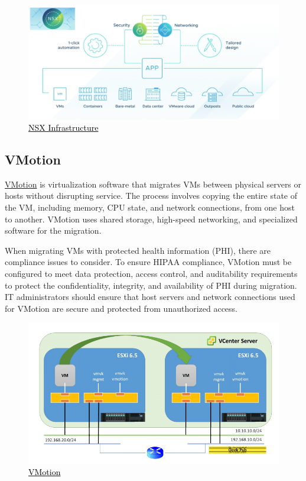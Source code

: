 \begin{figure}[H]
    \centering
    \includegraphics[scale = .19]{images/nsx-diagram.png}
    \caption{\href{https://www.linkedin.com/pulse/vmware-nsxdatacenter-full-stack-solution-part-1-ahmad-karim/}{\textcolor{black}{NSX Infrastructure}}}
    \label{NSX}
\end{figure}

\subsection{VMotion}
\href{https://www.vmware.com/products/vsphere/vmotion.html#:~:text=vMotion%20allows%20you%20to%3A,a%20virtual%20machine%20in%20seconds}{VMotion} is virtualization software that migrates VMs between physical servers or hosts without disrupting service. The process involves copying the entire state of the VM, including memory, CPU state, and network connections, from one host to another. VMotion uses shared storage, high-speed networking, and specialized software for the migration. 

When migrating VMs with protected health information (PHI), there are compliance issues to consider. To ensure HIPAA compliance, VMotion must be configured to meet data protection, access control, and auditability requirements to protect the confidentiality, integrity, and availability of PHI during migration. IT administrators should ensure that host servers and network connections used for VMotion are secure and protected from unauthorized access.

\begin{figure}[H]
    \centering
    \includegraphics[scale = .50]{images/vmotion.png}
    \caption{\href{https://www.thegeekpub.com/8407/how-vmotion-works/}{\textcolor{black}{VMotion}}}
    \label{VMotion}
\end{figure}